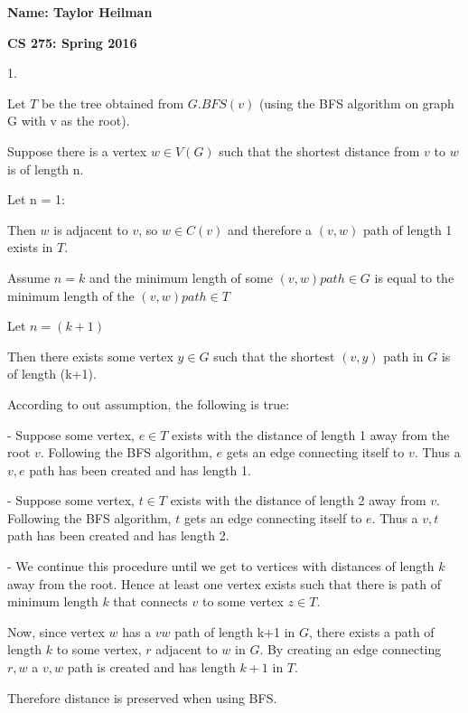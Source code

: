 \documentclass[12pt]{article}
\begin{document}
\textbf{Name: Taylor Heilman}    \hspace{4in} 
\begin{center} \textbf{CS 275: Spring 2016} \end{center}




{
1. 

Let $T$ be the tree obtained from $G.BFS(v)$ (using the BFS algorithm on graph G with v as the root).

Suppose there is a vertex $w \in V(G)$ such that the shortest distance from $v$ to $w$ is of length n.

Let n = 1:

Then $w$ is adjacent to $v$, so $w \in C(v)$ and therefore a $(v,w)$ path of length 1 exists in $T$.

Assume $n = k$ and the minimum length of some $(v,w) path \in G$ is equal to the minimum length of the $(v,w) path \in T$

Let $n = (k+1)$

Then there exists some vertex $y \in G$ such that the shortest $(v,y)$ path in $G$ is of length (k+1).

According to out assumption, the following is true:

- Suppose some vertex, $e \in T$ exists with the distance of length 1 away from the root $v$. Following the BFS algorithm, $e$ gets an edge connecting itself to $v$. Thus a $v,e$ path has been created and has length 1.

- Suppose some vertex, $t \in T$ exists with the distance of length 2 away from $v$. Following the BFS algorithm, $t$ gets an edge connecting itself to $e$. Thus a $v,t$ path has been created and has length 2.

- We continue this procedure until we get to vertices with distances of length $k$ away from the root. Hence at least one vertex exists such that there is path of minimum length $k$  that connects $v$ to some vertex $z \in T$.

Now, since vertex $w$ has a $vw$ path of length k+1 in $G$, there exists a path of length $k$ to some vertex, $r$ adjacent to $w$ in $G$.  By creating an edge connecting $r,w$ a $v,w$ path is created and has length $k+1$ in $T$.

Therefore distance is preserved when using BFS.

}
\end{document}
